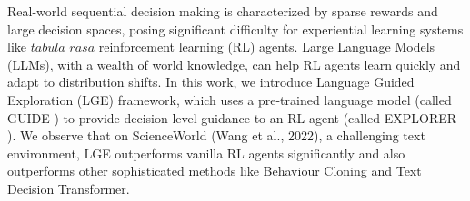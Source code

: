 Real-world sequential decision making is characterized by sparse rewards and large decision spaces, posing significant difficulty for experiential learning systems like $\textit{tabula rasa}$ reinforcement learning (RL) agents. Large Language Models (LLMs), with a wealth of world knowledge, can help RL agents learn quickly and adapt to distribution shifts. In this work, we introduce Language Guided Exploration (LGE) framework, which uses a pre-trained language model (called GUIDE ) to provide decision-level guidance to an RL agent (called EXPLORER ). We observe that on ScienceWorld (Wang et al., 2022), a challenging text environment, LGE outperforms vanilla RL agents significantly and also outperforms other sophisticated methods like Behaviour Cloning and Text Decision Transformer.